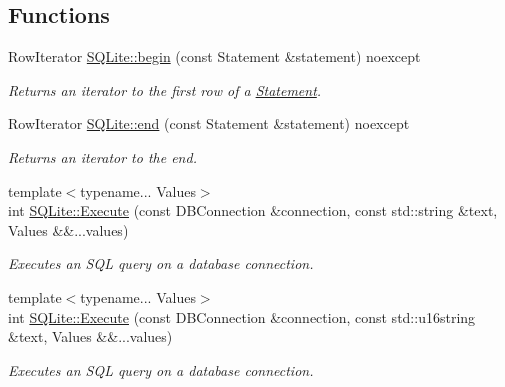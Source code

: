 \subsection*{Functions}
\begin{DoxyCompactItemize}
\item 
Row\-Iterator \hyperlink{a00038_a2ede4bc12dfc7f616c6519be580a00b8}{S\-Q\-Lite\-::begin} (const Statement \&statement) noexcept
\begin{DoxyCompactList}\small\item\em Returns an iterator to the first row of a \hyperlink{a00013}{Statement}. \end{DoxyCompactList}\item 
Row\-Iterator \hyperlink{a00038_a81414d1114232fd69009360999cb7d49}{S\-Q\-Lite\-::end} (const Statement \&statement) noexcept
\begin{DoxyCompactList}\small\item\em Returns an iterator to the end. \end{DoxyCompactList}\item 
{\footnotesize template$<$typename... Values$>$ }\\int \hyperlink{a00038_a2e59fc3438649aa88998d2c18c574b17}{S\-Q\-Lite\-::\-Execute} (const D\-B\-Connection \&connection, const std\-::string \&text, Values \&\&...values)
\begin{DoxyCompactList}\small\item\em Executes an S\-Q\-L query on a database connection. \end{DoxyCompactList}\item 
{\footnotesize template$<$typename... Values$>$ }\\int \hyperlink{a00038_a422d5b6ac99e4ed57f69fdc8a4cb904d}{S\-Q\-Lite\-::\-Execute} (const D\-B\-Connection \&connection, const std\-::u16string \&text, Values \&\&...values)
\begin{DoxyCompactList}\small\item\em Executes an S\-Q\-L query on a database connection. \end{DoxyCompactList}\end{DoxyCompactItemize}

